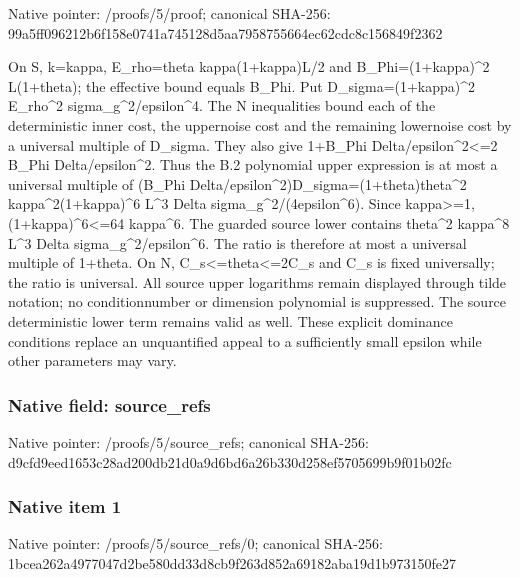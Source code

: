 \documentclass[10pt,a4paper]{article}
\begin{document}
Native pointer: /proofs/5/proof; canonical SHA-256: 99a5ff096212b6f158e0741a\allowbreak{}745128d5aa7958755664ec62\allowbreak{}cdc8c156849f2362


On S, k=kappa, E\_rho=theta kappa(1+kappa)L/2 and B\_Phi=(1+kappa)\textasciicircum{}2 L(1+theta); the effective bound equals B\_Phi. Put D\_sigma=(1+kappa)\textasciicircum{}2 E\_rho\textasciicircum{}2 sigma\_g\textasciicircum{}2/epsilon\textasciicircum{}4. The N inequalities bound each of the deterministic inner cost, the uppernoise cost and the remaining lowernoise cost by a universal multiple of D\_sigma. They also give 1+B\_Phi Delta/epsilon\textasciicircum{}2<=2 B\_Phi Delta/epsilon\textasciicircum{}2. Thus the B.2 polynomial upper expression is at most a universal multiple of
(B\_Phi Delta/epsilon\textasciicircum{}2)D\_sigma=\allowbreak{}(1+theta)theta\textasciicircum{}2 kappa\textasciicircum{}2(1+kappa)\textasciicircum{}6 L\textasciicircum{}3 Delta sigma\_g\textasciicircum{}2/(4epsilon\textasciicircum{}6).
Since kappa>=1, (1+kappa)\textasciicircum{}6<=64 kappa\textasciicircum{}6. The guarded source lower contains theta\textasciicircum{}2 kappa\textasciicircum{}8 L\textasciicircum{}3 Delta sigma\_g\textasciicircum{}2/epsilon\textasciicircum{}6. The ratio is therefore at most a universal multiple of 1+theta. On N, C\_s<=theta<=2C\_s and C\_s is fixed universally; the ratio is universal. All source upper logarithms remain displayed through tilde notation; no conditionnumber or dimension polynomial is suppressed. The source deterministic lower term remains valid as well. These explicit dominance conditions replace an unquantified appeal to a sufficiently small epsilon while other parameters may vary.


\subsubsection{Native field: source\_refs}


Native pointer: /proofs/5/source\_refs; canonical SHA-256: d9cfd9eed1653c28ad200db2\allowbreak{}1d0a9d6bd6a26b330d258ef5\allowbreak{}705699b9f01b02fc



\subsubsection{Native item 1}


Native pointer: /proofs/5/source\_refs/0; canonical SHA-256: 1bcea262a4977047d2be580d\allowbreak{}d33d8cb9f263d852a69182ab\allowbreak{}a19d1b973150fe27
\end{document}
